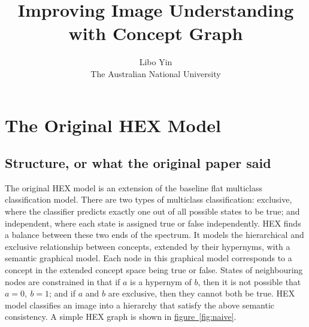 \documentclass[11pt,a4paper]{article}
\begin{document}
\title{Improving Image Understanding with Concept Graph}
\author{Libo Yin\\The Australian National University}
\maketitle
\section{The Original HEX Model}
\subsection{Structure, or what the original paper said}

The original HEX model \cite{deng2014large} is an extension of the baseline flat multiclass classification model. There are two types of multiclass classification: exclusive, where the classifier predicts exactly one out of all possible states to be true; and independent, where each state is assigned true or false independently. HEX finds a balance between these two ends of the spectrum. It models the hierarchical and exclusive relationship between concepts, extended by their hypernyms, with a semantic graphical model. Each node in this graphical model corresponds to a concept in the extended concept space being true or false. States of neighbouring nodes are constrained in that if $a$ is a hypernym of $b$, then it is not possible that $a=0,\ b=1$; and if $a$ and $b$ are exclusive, then they cannot both be true. HEX model classifies an image into a hierarchy that satisfy the above semantic consistency. A simple HEX graph is shown in \hyperref[fig:naive]{figure~\ref{fig:naive}}.
\end{document}
